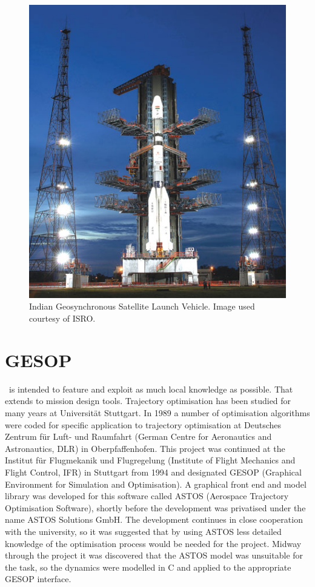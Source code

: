 \begin{figure} [h]
\caption{Indian Geosynchronous Satellite Launch Vehicle. Image used courtesy of ISRO.}
\label{fig:GSLV}
\centering
\includegraphics[scale=0.50]{Images/GSLV2.jpg}
\end{figure}

\section{GESOP} \label{sec:GESOP}

\BW\ is intended to feature and exploit as much local knowledge as possible. That extends to mission design tools. 
Trajectory optimisation has been studied for many years at Universit\"{a}t Stuttgart. In 1989 a number of optimisation algorithms were coded for specific application to trajectory optimisation at Deutsches Zentrum f\"{u}r Luft- und Raumfahrt (German Centre for Aeronautics and Astronautics, DLR) in Oberpfaffenhofen. This project was continued at the Institut f\"{u}r Flugmekanik und Flugregelung (Institute of Flight Mechanics and Flight Control, IFR) in Stuttgart from 1994 and designated GESOP (Graphical Environment for Simulation and Optimisation). A graphical front end and model library was developed for this software called ASTOS (Aerospace Trajectory Optimisation Software), shortly before the development was privatised under the name ASTOS Solutions GmbH. The development continues in close cooperation with the university, so it was suggested that by using ASTOS less detailed knowledge of the optimisation process would be needed for the project. Midway through the project it was discovered that the ASTOS model was unsuitable for the task, so the dynamics were modelled in C and applied to the appropriate GESOP interface.
